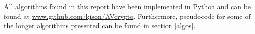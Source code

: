 All algorithms found in this report have been implemented in Python and can be found at \href{https://github.com/kjson/AVcrypto/}{www.github.com/kjson/AVcrypto}. Furthermore, pseudocode for some of the longer algorithms presented can be found in section \ref{algos}.   